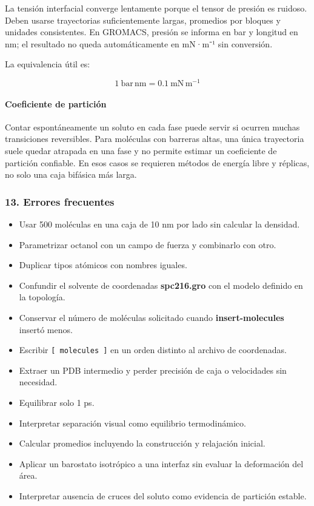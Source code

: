 \documentclass[
  spanish,
  11pt,
  a4paper]{article}
\providecommand{\tightlist}{%
  \setlength{\itemsep}{0pt}\setlength{\parskip}{0pt}}
\begin{document}
La tensión interfacial converge lentamente porque el tensor de presión
es ruidoso. Deben usarse trayectorias suficientemente largas, promedios
por bloques y unidades consistentes. En GROMACS, presión se informa en
bar y longitud en nm; el resultado no queda automáticamente en mN·m⁻¹
sin conversión.

La equivalencia útil es:

\[
1\ \mathrm{bar\,nm}=0.1\ \mathrm{mN\,m^{-1}}
\]

\paragraph{Coeficiente de partición}\label{coeficiente-de-particiuxf3n}

Contar espontáneamente un soluto en cada fase puede servir si ocurren
muchas transiciones reversibles. Para moléculas con barreras altas, una
única trayectoria suele quedar atrapada en una fase y no permite estimar
un coeficiente de partición confiable. En esos casos se requieren
métodos de energía libre y réplicas, no solo una caja bifásica más
larga.

\subsubsection{13. Errores frecuentes}\label{errores-frecuentes}

\begin{itemize}
\tightlist
\item
  Usar 500 moléculas en una caja de 10 nm por lado sin calcular la
  densidad.
\item
  Parametrizar octanol con un campo de fuerza y combinarlo con otro.
\item
  Duplicar tipos atómicos con nombres iguales.
\item
  Confundir el solvente de coordenadas \textbf{spc216.gro} con el modelo
  definido en la topología.
\item
  Conservar el número de moléculas solicitado cuando
  \textbf{insert-molecules} insertó menos.
\item
  Escribir \texttt{{[}\ molecules\ {]}} en un orden distinto al archivo
  de coordenadas.
\item
  Extraer un PDB intermedio y perder precisión de caja o velocidades sin
  necesidad.
\item
  Equilibrar solo 1 ps.
\item
  Interpretar separación visual como equilibrio termodinámico.
\item
  Calcular promedios incluyendo la construcción y relajación inicial.
\item
  Aplicar un barostato isotrópico a una interfaz sin evaluar la
  deformación del área.
\item
  Interpretar ausencia de cruces del soluto como evidencia de partición
  estable.
\end{itemize}
\end{document}

